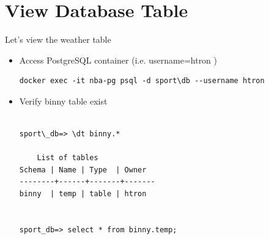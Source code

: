 \documentclass[a4paper,11pt]{article}
\begin{document}
    \section{View Database Table}
    Let's view the  weather table 
    \begin{itemize}
    \item Access PostgreSQL container (i.e. username=htron )  \smallskip
    \begin{verbatim} 
docker exec -it nba-pg psql -d sport\db --username htron
    \end{verbatim} 

    \item Verify binny table exist  \smallskip
    \begin{verbatim} 

sport\_db=> \dt binny.*

    List of tables
Schema | Name | Type  | Owner 
--------+------+-------+-------
binny  | temp | table | htron

 
sport_db=> select * from binny.temp;


\end{verbatim}
\end{itemize}
\end{document}
